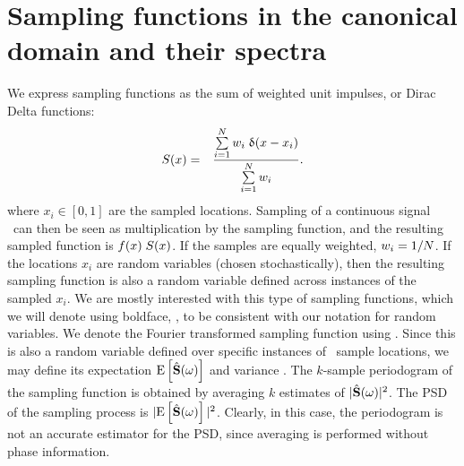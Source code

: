 \section{Sampling functions in the canonical domain and their spectra} \label{sec:sfn}
We express sampling functions as the sum of weighted unit impulses, or Dirac Delta functions:
\begin{eqnarray}
    S(x) &=& \frac { \sum\limits_{i=1}^{N} w_i \; \updelta(x-x_i) } {\sum\limits_{i=1}^{N} w_i }.
\end{eqnarray}
where $x_i \in [0,1]$ are the sampled locations. Sampling of a continuous signal \ifn\ can then be seen as multiplication by the sampling function, and the resulting sampled function is $ f(x) \; S(x)$. If the samples are equally weighted, $w_i = 1/N$. If the locations $x_i$ are random variables (chosen stochastically), then the resulting sampling function is also a random variable defined across instances of the sampled $x_i$. We are mostly interested with this type of sampling functions, which we will denote using boldface, \sfn, to be consistent with our notation for random variables. We denote the Fourier transformed sampling function using \SF. Since this is also a random variable defined over specific instances of \N\ sample locations, we may define its expectation $\mathrm{E} \left[\hat{\mathbf{S}}(\omega) \right]$ and variance \Var{\SF}. The $k$-sample periodogram of the sampling function is obtained by averaging $k$ estimates of $|\hat{\mathbf{S}}(\omega)|^2$. The PSD of the sampling process is $|\mathrm{E} \left[\hat{\mathbf{S}}(\omega) \right]|^2$. Clearly, in this case, the periodogram is not an accurate estimator for the PSD, since averaging is performed without phase information. 


